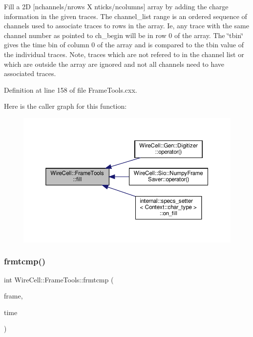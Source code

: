 Fill a 2D \mbox{[}nchannels/nrows X nticks/ncolumns\mbox{]} array by adding the charge information in the given traces. The channel\+\_\+list range is an ordered sequence of channels used to associate traces to rows in the array. Ie, any trace with the same channel number as pointed to ch\+\_\+begin will be in row 0 of the array. The \char`\"{}tbin\char`\"{} gives the time bin of column 0 of the array and is compared to the tbin value of the individual traces. Note, traces which are not refered to in the channel list or which are outside the array are ignored and not all channels need to have associated traces. 

Definition at line 158 of file Frame\+Tools.\+cxx.

Here is the caller graph for this function\+:
\nopagebreak
\begin{figure}[H]
\begin{center}
\leavevmode
\includegraphics[width=350pt]{namespace_wire_cell_1_1_frame_tools_a09db410acc8cf771ec60faec4eae7eef_icgraph}
\end{center}
\end{figure}
\mbox{\label{namespace_wire_cell_1_1_frame_tools_a21c3c601b6103fa7a63d9131b81dc229}} 
\subsubsection{\texorpdfstring{frmtcmp()}{frmtcmp()}}
{\footnotesize\ttfamily int Wire\+Cell\+::\+Frame\+Tools\+::frmtcmp (\begin{DoxyParamCaption}\item[{\hyperlink{class_wire_cell_1_1_i_data_aff870b3ae8333cf9265941eef62498bc}{I\+Frame\+::pointer}}]{frame,  }\item[{double}]{time }\end{DoxyParamCaption})}

